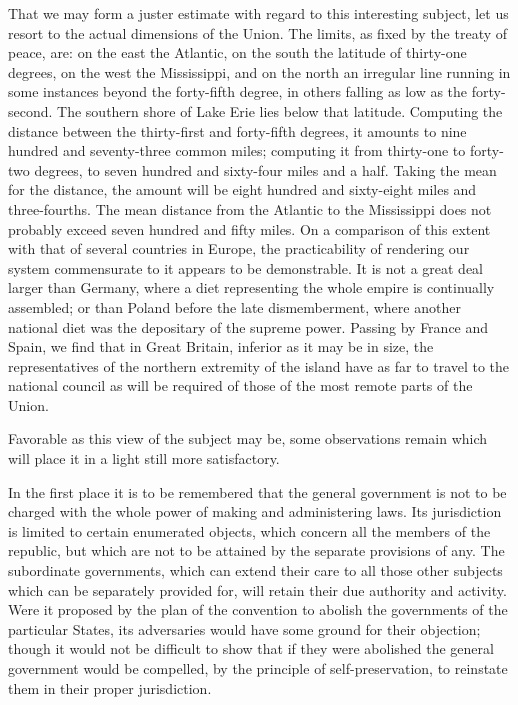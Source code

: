 That we may form a juster estimate with regard to this interesting subject, let us resort to the actual dimensions of the Union. 
The limits, as fixed by the treaty of peace, are: on the east the Atlantic, on the south the latitude of thirty-one degrees, on the west the Mississippi, and on the north an irregular line running in some instances beyond the forty-fifth degree, in others falling as low as the forty-second. 
The southern shore of Lake Erie lies below that latitude. 
Computing the distance between the thirty-first and forty-fifth degrees, it amounts to nine hundred and seventy-three common miles; computing it from thirty-one to forty-two degrees, to seven hundred and sixty-four miles and a half. 
Taking the mean for the distance, the amount will be eight hundred and sixty-eight miles and three-fourths. 
The mean distance from the Atlantic to the Mississippi does not probably exceed seven hundred and fifty miles. 
On a comparison of this extent with that of several countries in Europe, the practicability of rendering our system commensurate to it appears to be demonstrable. 
It is not a great deal larger than Germany, where a diet representing the whole empire is continually assembled; or than Poland before the late dismemberment, where another national diet was the depositary of the supreme power. 
Passing by France and Spain, we find that in Great Britain, inferior as it may be in size, the representatives of the northern extremity of the island have as far to travel to the national council as will be required of those of the most remote parts of the Union.

Favorable as this view of the subject may be, some observations remain which will place it in a light still more satisfactory.

In the first place it is to be remembered that the general government is not to be charged with the whole power of making and administering laws. 
Its jurisdiction is limited to certain enumerated objects, which concern all the members of the republic, but which are not to be attained by the separate provisions of any. 
The subordinate governments, which can extend their care to all those other subjects which can be separately provided for, will retain their due authority and activity. 
Were it proposed by the plan of the convention to abolish the governments of the particular States, its adversaries would have some ground for their objection; though it would not be difficult to show that if they were abolished the general government would be compelled, by the principle of self-preservation, to reinstate them in their proper jurisdiction.

